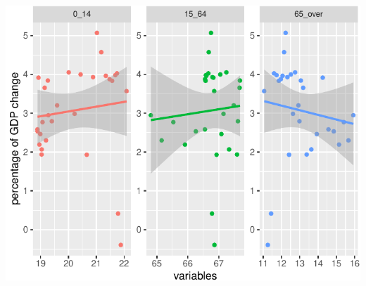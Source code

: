 \documentclass[11pt,a4paper,]{article}
\begin{document}
\begin{center}\includegraphics{Figures/lm1-1} \end{center}

\providecommand{\docline}[3]{\noalign{\global\setlength{\arrayrulewidth}{#1}}\arrayrulecolor[HTML]{#2}\cline{#3}}

\setlength{\tabcolsep}{2pt}

\renewcommand*{\arraystretch}{1.5}
\end{document}
